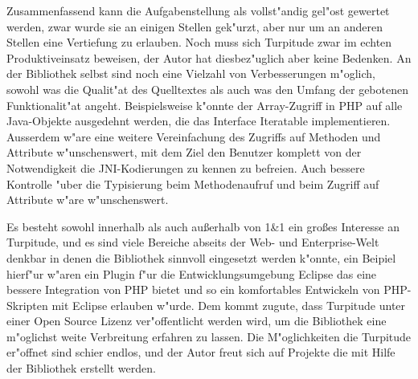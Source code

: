 Zusammenfassend kann die Aufgabenstellung als vollst"andig gel"ost gewertet werden, zwar wurde sie an einigen Stellen
gek"urzt, aber nur um an anderen Stellen eine Vertiefung zu erlauben.
Noch muss sich Turpitude zwar im echten Produktiveinsatz beweisen, der Autor hat diesbez"uglich aber keine Bedenken.
An der Bibliothek selbst sind noch eine Vielzahl von Verbesserungen m"oglich, sowohl was die Qualit"at des Quelltextes
als auch was den Umfang der gebotenen Funktionalit"at angeht. Beispielsweise k"onnte der Array-Zugriff in PHP auf alle
Java-Objekte ausgedehnt werden, die das Interface Iteratable implementieren. Ausserdem w"are eine weitere Vereinfachung
des Zugriffs auf Methoden und Attribute w"unschenswert, mit dem Ziel den Benutzer komplett von der Notwendigkeit die
JNI-Kodierungen zu kennen zu befreien. Auch bessere Kontrolle "uber die Typisierung beim Methodenaufruf und beim Zugriff
auf Attribute w"are w"unschenswert.

Es besteht sowohl innerhalb als auch au\ss erhalb von 1\&1 ein gro\ss es Interesse an Turpitude, und es sind viele Bereiche
abseits der Web- und Enterprise-Welt denkbar in denen die Bibliothek sinnvoll eingesetzt werden k"onnte, ein Beipiel hierf"ur
w"aren ein Plugin f"ur die Entwicklungsumgebung Eclipse das eine bessere Integration von PHP bietet und so ein komfortables
Entwickeln von PHP-Skripten mit Eclipse erlauben w"urde. Dem kommt zugute, dass Turpitude unter einer Open Source Lizenz ver"offentlicht
werden wird, um die Bibliothek eine m"oglichst weite Verbreitung erfahren zu lassen.
Die M"oglichkeiten die Turpitude er"offnet sind schier endlos, und der Autor freut sich auf Projekte die mit 
Hilfe der Bibliothek erstellt werden.


